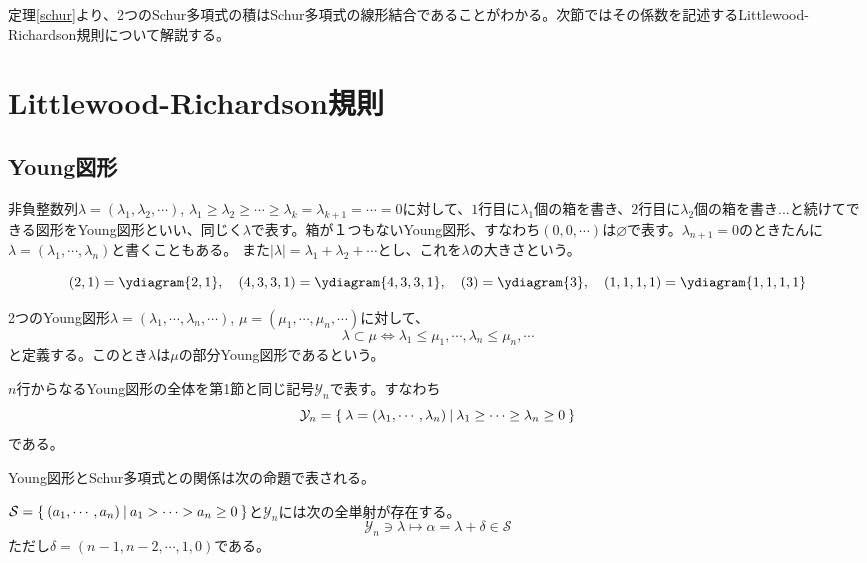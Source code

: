 \documentclass{ltjsreport}
\begin{document}
定理\ref{schur}より、2つのSchur多項式の積はSchur多項式の線形結合であることがわかる。次節ではその係数を記述するLittlewood-Richardson規則について解説する。





\section{Littlewood-Richardson規則}
\subsection{Young図形}
\begin{defin}
    非負整数列$\lambda=(\lambda_1,\lambda_2,\cdots)$, $\lambda_1\geq\lambda_2\geq\cdots\geq \lambda_{k}=\lambda_{k+1}=\cdots=0$に対して、$1$行目に$\lambda_1$個の箱を書き、$2$行目に$\lambda_2$個の箱を書き...と続けてできる図形をYoung図形といい、同じく$\lambda$で表す。箱が１つもないYoung図形、すなわち$(0,0,\cdots)$は$\varnothing$で表す。$\lambda_{n+1}=0$のときたんに$\lambda=(\lambda_1,\cdots,\lambda_n)$と書くこともある。
    また$|\lambda|=\lambda_1+\lambda_2+\cdots$とし、これを$\lambda$の大きさという。
\end{defin}

\begin{eg}
    \[
    (2,1)=\ydiagram{2,1},\quad (4,3,3,1)=\ydiagram{4,3,3,1},\quad (3)=\ydiagram{3},\quad (1,1,1,1)=\ydiagram{1,1,1,1}
    \]
\end{eg}

\begin{defin}
    2つのYoung図形$\lambda=(\lambda_1,\cdots,\lambda_n,\cdots)$, $\mu=(\mu_1,\cdots,\mu_n,\cdots)$に対して、
    \[
    \lambda\subset \mu\Leftrightarrow \lambda_1\leq \mu_1,\cdots,\lambda_n\leq\mu_n,\cdots   
    \]
    と定義する。このとき$\lambda$は$\mu$の部分Young図形であるという。
\end{defin}

\begin{defin}
    $n$行からなるYoung図形の全体を第1節と同じ記号$\mathcal{Y}_n$で表す。すなわち
    \[
    \mathcal{Y}_n=\left\{\:\lambda=(\lambda_1,\cdots,\lambda_n)\:\middle|\:\lambda_1\geq \cdots\geq\lambda_n\geq 0\:\right\}
    \]
    である。
\end{defin}



Young図形とSchur多項式との関係は次の命題で表される。
\begin{prop}
    $\mathcal{S}=\left\{\:(a_1,\cdots,a_n)\:\middle|\:a_1>\cdots>a_n\geq 0\:\right\}$と$\mathcal{Y}_n$には次の全単射が存在する。
    \[
    \mathcal{Y}_n\owns \lambda \mapsto \alpha=\lambda+\delta \in\mathcal{S}   
    \]
    ただし$\delta=(n-1,n-2,\cdots,1,0)$である。
\end{prop}
\end{document}
